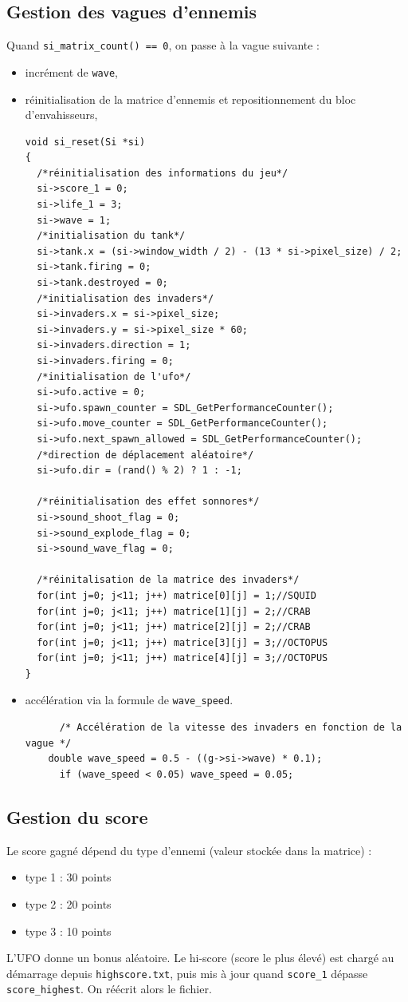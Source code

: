 \documentclass[12pt,a4paper]{report}
\begin{document}
\subsection{Gestion des vagues d'ennemis}
Quand \texttt{si\_matrix\_count() == 0}, on passe à la vague suivante :
\begin{itemize}
  \item incrément de \texttt{wave},
  \item réinitialisation de la matrice d'ennemis et repositionnement du bloc d'envahisseurs,
      \begin{lstlisting}
void si_reset(Si *si)
{
  /*réinitialisation des informations du jeu*/
  si->score_1 = 0;
  si->life_1 = 3;
  si->wave = 1; 
  /*initialisation du tank*/
  si->tank.x = (si->window_width / 2) - (13 * si->pixel_size) / 2;
  si->tank.firing = 0;
  si->tank.destroyed = 0;
  /*initialisation des invaders*/
  si->invaders.x = si->pixel_size;
  si->invaders.y = si->pixel_size * 60;
  si->invaders.direction = 1;
  si->invaders.firing = 0;
  /*initialisation de l'ufo*/
  si->ufo.active = 0;
  si->ufo.spawn_counter = SDL_GetPerformanceCounter();
  si->ufo.move_counter = SDL_GetPerformanceCounter();
  si->ufo.next_spawn_allowed = SDL_GetPerformanceCounter();
  /*direction de déplacement aléatoire*/
  si->ufo.dir = (rand() % 2) ? 1 : -1;

  /*réinitialisation des effet sonnores*/
  si->sound_shoot_flag = 0;
  si->sound_explode_flag = 0;
  si->sound_wave_flag = 0;
  
  /*réinitalisation de la matrice des invaders*/
  for(int j=0; j<11; j++) matrice[0][j] = 1;//SQUID
  for(int j=0; j<11; j++) matrice[1][j] = 2;//CRAB
  for(int j=0; j<11; j++) matrice[2][j] = 2;//CRAB
  for(int j=0; j<11; j++) matrice[3][j] = 3;//OCTOPUS
  for(int j=0; j<11; j++) matrice[4][j] = 3;//OCTOPUS
}
    \end{lstlisting}
    
  \item accélération via la formule de \texttt{wave\_speed}.
    \begin{lstlisting}
	  /* Accélération de la vitesse des invaders en fonction de la vague */
	double wave_speed = 0.5 - ((g->si->wave) * 0.1);
	  if (wave_speed < 0.05) wave_speed = 0.05;
    \end{lstlisting}
\end{itemize}


\subsection{Gestion du score}
Le score gagné dépend du type d'ennemi (valeur stockée dans la matrice) :
\begin{itemize}
  \item type 1 : 30 points
  \item type 2 : 20 points
  \item type 3 : 10 points
\end{itemize}
L'UFO donne un bonus aléatoire.
Le hi-score (score le plus élevé) est chargé au démarrage depuis \texttt{highscore.txt}, puis mis à jour quand
\texttt{score\_1} dépasse \texttt{score\_highest}. On réécrit alors le fichier.
\end{document}
